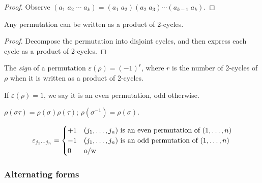 \documentclass{../../template/note}
\begin{document}
    \begin{proof}
        Observe \((a_1\;a_2\;\cdots\;a_k) = (a_1\;a_2)(a_2\;a_3)\cdots(a_{k-1}\;a_k)\).
    \end{proof}
    
    \begin{corollary}
        Any permutation can be written as a product of 2-cycles.
    \end{corollary}
    
    \begin{proof}
        Decompose the permutation into disjoint cycles, and then express each cycle as a product of 2-cycles.
    \end{proof}
    
    \begin{definition}
        The \emph{sign} of a permutation \(\varepsilon(\rho) = (-1)^r\), where \(r\) is the number of 2-cycles of \(\rho\) when it is written as a product of 2-cycles.

        If \(\varepsilon(\rho) = 1\), we say it is an even permutation, odd otherwise.
    \end{definition}

    \begin{remark*}
        \(\rho(\sigma \tau) = \rho(\sigma)\rho(\tau)\); \(\rho(\sigma^{-1}) = \rho(\sigma)\).
    \end{remark*}
    
    
    
    \begin{definition}
        \[
            \varepsilon_{j_1\cdots j_n} = \begin{cases}
                +1 & (j_1, \dots, j_n) \text{ is an even permutation of } (1, \dots, n) \\
                -1 & (j_1, \dots, j_n) \text{ is an odd permutation of } (1, \dots, n) \\
                0 & \text{o/w}
            \end{cases}
        \]
    \end{definition}
    

    \subsubsection{Alternating forms}
\end{document}
